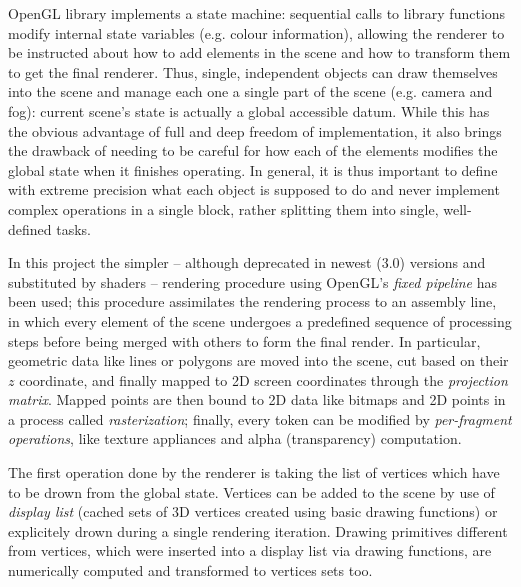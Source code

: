 OpenGL library implements a state machine: sequential calls to library
functions modify internal state variables (e.g. colour information), allowing the renderer to be
instructed about how to add elements in the scene and how to transform them to
get the final renderer. Thus, single, independent objects can draw themselves
into the scene and manage each one a single part of the scene (e.g. camera and
fog): current scene's state is actually a global accessible datum. While this
has the obvious advantage of full and deep freedom of implementation, it also
brings the drawback of needing to be careful for how each of the elements
modifies the global state when it finishes operating. In general, it is thus
important to define with extreme precision what each object is supposed to do
and never implement complex operations in a single block, rather splitting them
into single, well-defined tasks.

In this project the simpler -- although deprecated in newest (3.0) versions and
substituted by shaders --
rendering procedure using OpenGL's \emph{fixed pipeline} has been used; this
procedure assimilates the rendering process to an assembly line, in which every
element of the scene undergoes a predefined sequence of processing steps before
being merged with others to form the final render. In particular, geometric data
like lines or polygons are moved into the scene, cut based on their $z$ coordinate, and
finally mapped to 2D screen coordinates through the \emph{projection matrix}.
Mapped points are then bound to 2D data like bitmaps and 2D points in a
process called \emph{rasterization}; finally, every token can be modified by
\emph{per-fragment operations}, like texture appliances and alpha (transparency)
computation.

The first operation done by the renderer is taking the list of vertices
which have to be drown from the global state. Vertices can be added to the
scene by use of \emph{display list} (cached sets of 3D vertices created using
basic drawing functions) or explicitely drown during a single rendering
iteration. Drawing primitives different from vertices, which were inserted into a
display list via drawing functions, are numerically computed and transformed to
vertices sets too.

